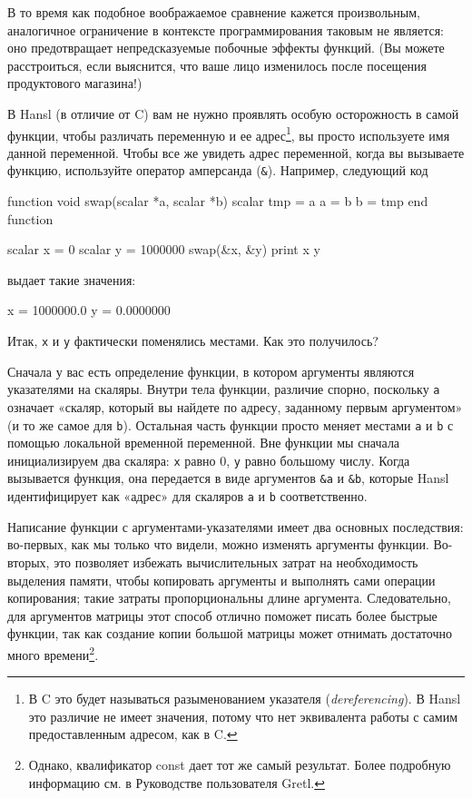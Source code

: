 В то время как подобное воображаемое сравнение кажется произвольным,
аналогичное ограничение в контексте программирования таковым не
является: оно предотвращает непредсказуемые побочные эффекты
функций. (Вы можете расстроиться, если выяснится, что ваше лицо
изменилось после посещения продуктового магазина!)

В Hansl (в отличие от C) вам не нужно проявлять особую осторожность в
самой функции, чтобы различать переменную и ее адрес\footnote{В C это
  будет называться разыменованием указателя (\emph{dereferencing}). В
  Hansl это различие не имеет значения, потому что нет эквивалента
  работы с самим предоставленным адресом, как в C.}, вы просто
используете имя данной переменной. Чтобы все же увидеть адрес
переменной, когда вы вызываете функцию, используйте оператор
амперсанда (\verb|&|). Например, следующий код
\begin{code}
function void swap(scalar *a, scalar *b)
    scalar tmp = a
    a = b
    b = tmp
end function

scalar x = 0
scalar y = 1000000
swap(&x, &y)
print x y
\end{code}
выдает такие значения:
\begin{code}
              x =  1000000.0
              y =  0.0000000
\end{code}
Итак, \texttt{x} и \texttt{y} фактически поменялись местами. Как это
получилось?

Сначала у вас есть определение функции, в котором аргументы являются
указателями на скаляры. Внутри тела функции, различие спорно,
поскольку \verb|a| означает «скаляр, который вы найдете по адресу,
заданному первым аргументом» (и то же самое для \verb|b|). Остальная
часть функции просто меняет местами \verb|a| и \verb|b| с помощью
локальной временной переменной.  Вне функции мы сначала инициализируем
два скаляра: \texttt{x} равно 0, \texttt{y} равно большому
числу. Когда вызывается функция, она передается в виде аргументов
\verb|&a| и \verb|&b|, которые Hansl идентифицирует как «адрес» для
скаляров \texttt{a} и \texttt{b} соответственно.

Написание функции с аргументами-указателями имеет два основных
последствия: во-первых, как мы только что видели, можно изменять
аргументы функции. Во-вторых, это позволяет избежать вычислительных
затрат на необходимость выделения памяти, чтобы копировать аргументы и
выполнять сами операции копирования; такие затраты пропорциональны
длине аргумента. Следовательно, для аргументов матрицы этот способ
отлично поможет писать более быстрые функции, так как создание копии
большой матрицы может отнимать достаточно много
времени\footnote{Однако, квалификатор const дает тот же самый
  результат. Более подробную информацию см. в Руководстве пользователя
  Gretl.}.

